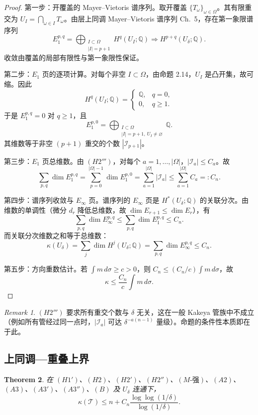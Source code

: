 \documentclass[11pt,a4paper]{article}
\newtheorem{theorem}{Theorem}[section]
\theoremstyle{remark}
\newtheorem{remark}[theorem]{Remark}
\begin{document}
	\begin{proof}
		第一步：开覆盖的 Mayer--Vietoris 谱序列。取开覆盖 $\{T_\omega\}_{\omega\in\Omega}$。其有限重交为 $U_I=\bigcap_{\omega\in I}T_\omega$。由层上同调 Mayer–Vietoris 谱序列 \cite{Weibel1994} Ch.~5，存在第一象限谱序列
		\[
		E_1^{p,q}=\bigoplus_{\substack{I\subset\Omega\\ |I|=p+1}}H^q(U_I;\mathbb Q)\Longrightarrow H^{p+q}(U_\delta;\mathbb Q).
		\]
		收敛由覆盖的局部有限性与第一象限性保证。
		
		第二步：$E_1$ 页的逐项计算。对每个非空 $I\subset\Omega$，由命题 2.14，$U_I$ 是凸开集，故可缩。因此
		\[
		H^q(U_I;\mathbb Q)=\begin{cases}\mathbb Q,&q=0,\\0,&q\ge1.\end{cases}
		\]
		于是 $E_1^{p,q}=0$ 对 $q\ge1$，且
		\[
		E_1^{p,0}=\bigoplus_{\substack{I\subset\Omega\\ |I|=p+1,\ U_I\neq\varnothing}}\mathbb Q.
		\]
		其维数等于非空 $(p+1)$ 重交的个数 $|\mathcal I_{p+1}|$。
		
		第三步：$E_1$ 页总维数。由 $(H2''')$，对每个 $a=1,\ldots,|\Omega|$，$|\mathcal I_a|\le C_a$。故
		\[
		\sum_{p,q}\dim E_1^{p,q}
		=\sum_{p=0}^{|\Omega|-1}\dim E_1^{p,0}
		=\sum_{a=1}^{|\Omega|}|\mathcal I_a|
		\le\sum_{a=1}^{|\Omega|}C_a=:C_n.
		\]
		
		第四步：谱序列收敛与 $E_\infty$ 页。谱序列的 $E_\infty$ 页是 $H^*(U_\delta;\mathbb Q)$ 的关联分次。由维数的单调性（微分 $d_r$ 降低总维数，故 $\dim E_{r+1}\le\dim E_r$），有
		\[
		\sum_{p,q}\dim E_\infty^{p,q}\le\sum_{p,q}\dim E_1^{p,q}\le C_n.
		\]
		而关联分次维数之和等于总维数：
		\[
		\kappa(U_\delta)=\sum_j\dim H^j(U_\delta;\mathbb Q)
		=\sum_{p,q}\dim E_\infty^{p,q}\le C_n.
		\]
		
		第五步：方向重数估计。若 $\int m\,d\sigma\ge c>0$，则 $C_n\le(C_n/c)\int m\,d\sigma$，故
		\[
		\kappa\le\frac{C_n}{c}\int m\,d\sigma.
		\]
	\end{proof}
	
	\begin{remark}
		$(H2''')$ 要求所有重交个数与 $\delta$ 无关，这在一般 Kakeya 管族中不成立（例如所有管经过同一点时，$|\mathcal I_a|$ 可达 $\delta^{-a(n-1)}$ 量级）。命题的条件性本质即在于此。
	\end{remark}
	
	\subsection{上同调—重叠上界}
	\begin{theorem}
		在 $(H1')$、$(H2)$、$(H2')$、$(H2'')$、$(M‑强)$、$(A2)$、$(A3)$、$(A3')$、$(A3'')$、$(B)$ 及 $U_\delta$ 连通下，
		\[
		\kappa(\mathcal T)\le n+C_n\frac{\log\log(1/\delta)}{\log(1/\delta)}.
		\]
	\end{theorem}
	
\end{document}
